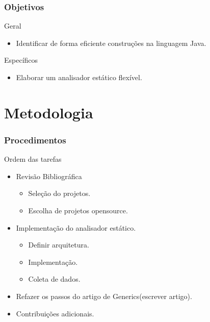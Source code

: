 \documentclass[]{beamer}
\begin{document}
	
	\begin{frame}[fragile]\frametitle{Objetivos}
		\begin{block}{Geral}
			\begin{itemize}
				\item Identificar de forma eficiente construções na linguagem Java.
			\end{itemize}
		\end{block}
			
			\begin{block}{Específicos}
				\begin{itemize}
					\item Elaborar um analisador estático flexível.
				\end{itemize}
			\end{block}
	\end{frame}
	
	\section{Metodologia}
	\begin{frame}[label=metodologia, fragile]
		\frametitle{Procedimentos}
		\begin{block}{Ordem das tarefas}
			\begin{itemize}
				\item Revisão Bibliográfica
					\begin{itemize}
						\item Seleção do projetos.
						\item Escolha de projetos opensource.
					\end{itemize}
				\item Implementação do analisador estático.
					\begin{itemize}
						\item Definir arquitetura.
						\item Implementação.
						\item Coleta de dados.
					\end{itemize}
					
				\item Refazer os passos do artigo de Generics(escrever artigo).
			
				\item Contribuições adicionais.
			\end{itemize}
		\end{block}
	\end{frame}
	
\end{document}
